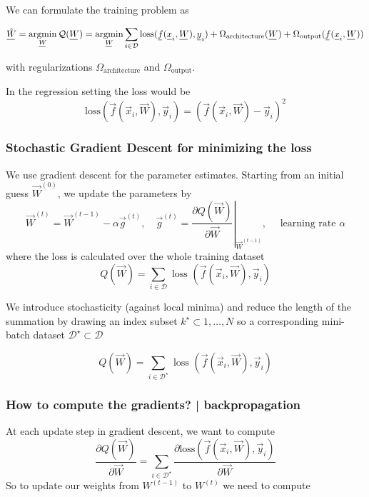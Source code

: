 We can formulate the training problem as

\begin{equation}
    \vec{\hat{W}} = \argmin_{\vec{W}} \mathcal{Q}(\vec{W}) = \argmin_{\vec{W}} \sum_{i\in \mathcal{D}} \text{loss}(\vec{f}(\vec{x}_i, \vec{W}), \vec{y}_i) + \Omega_\text{architecture}(\vec{W}) + \Omega_\text{output}(\vec{f}(\vec{x}_i, \vec{W}))
\end{equation}

with regularizations $\Omega_\text{architecture}$ and $\Omega_\text{output}$.

In the regression setting the loss would be
\begin{equation}
    \text{loss}(\vec{f}(\vec{x}_i, \vec{W}), \vec{y}_i) = \left(\vec{f}(\vec{x}_i, \vec{W}) - \vec{y}_i \right)^2
\end{equation}

\subsubsection{Stochastic Gradient Descent for minimizing the loss}
We use gradient descent for the parameter estimates.
Starting from an initial guess $\vec{W}^{(0)}$, we update the parameters by
\begin{equation}
    \vec{W}^{(t)}=\vec{W}^{(t-1)}-\alpha \vec{g}^{(t)}, \quad \vec{g}^{(t)}=\left.\frac{\partial Q(\vec{W})}{\partial \vec{W}}\right|_{\vec{W}^{(t-1)}}, \quad \text { learning rate } \alpha
\end{equation}
where the loss is calculated over the whole training dataset
\begin{equation}
    Q(\vec{W})=\sum_{i \in \mathcal{D}} \text { loss }\left(\vec{f}\left(\vec{x}_{i}, \vec{W}\right), \vec{y}_{i}\right)
\end{equation}

We introduce stochasticity (against local minima) and reduce the length of the summation
by drawing an index subset $k^\star \subset 1, \ldots, N$ so a corresponding mini-batch
dataset $\mathcal{D}^\star \subset \mathcal{D}$

\begin{equation}
    Q(\vec{W})=\sum_{i \in \mathcal{D}^\star} \text { loss }\left(\vec{f}\left(\vec{x}_{i}, \vec{W}\right), \vec{y}_{i}\right)
\end{equation}

\subsubsection{How to compute the gradients? | backpropagation}
At each update step in gradient descent, we want to compute
\begin{equation}
    \frac{\partial Q(\vec{W})}{\partial \vec{W}} = \sum_{i \in \mathcal{D}^\star} \frac{\partial \text{loss}\left(\vec{f}\left(\vec{x}_{i}, \vec{W}\right), \vec{y}_{i}\right)}{\partial \vec{W}}
\end{equation}
So to update our weights from $W^{(t-1)}$ to $W^{(t)}$ we need to compute

